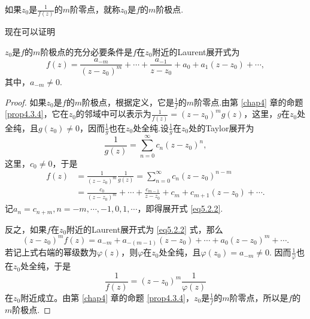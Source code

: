 \begin{definition}\label{def5.2.3}
如果$z_0$是$\frac1{f(z)}$的$m$阶零点，就称$z_0$是$f$的$m$阶极点.
\end{definition}

现在可以证明
\begin{theorem}\label{thm5.2.4}
$z_0$是$f$的$m$阶极点的充分必要条件是$f$在$z_0$附近的Laurent展开式为
\begin{equation}\label{eq5.2.2}
f(z)=\frac{a_{-m}}{(z-z_0)^m}+\cdots+\frac{a_{-1}}{z-z_0}+a_0+a_1(z-z_0)+\cdots,
\end{equation}
其中，$a_{-m}\ne0$.
\end{theorem}
\begin{proof}
  如果$z_0$是$f$的$m$阶极点，根据定义，它是$\frac1f$的$m$阶零点.由第 \ref{chap4} 章的命题 \ref{prop4.3.4}，它在$z_0$的邻域中可以表示为$\frac1{f(z)}=(z-z_0)^mg(z)$，这里，$g$在$z_0$处全纯，且$g(z_0)\ne0$，因而$\frac1g$也在$z_0$处全纯.设$\frac1g$在$z_0$处的Taylor展开为
  \[\frac1{g(z)}=\sum_{n=0}^\infty c_n(z-z_0)^n,\]
这里，$c_0\ne0$，于是
\begin{align*}
f(z)&=\frac1{(z-z_0)^m}\frac1{g(z)}=\sum_{n=0}^\infty c_n(z-z_0)^{n-m}\\
&=\frac{c_0}{(z-z_0)^m}+\cdots+\frac{c_{m-1}}{z-z_0}
+c_m+c_{m+1}(z-z_0)+\cdots.
\end{align*}
记$a_n=c_{n+m},n=-m,\cdots,-1,0,1,\cdots$，即得展开式 \eqref{eq5.2.2}.

反之，如果$f$在$z_0$附近的Laurent展开式为 \eqref{eq5.2.2} 式，那么
\[(z-z_0)^mf(z)=a_{-m}+a_{-(m-1)}(z-z_0)+\cdots+a_0(z-z_0)^m+\cdots.\]
若记上式右端的幂级数为$\varphi(z)$，则$\varphi$在$z_0$处全纯，且$\varphi(z_0)=a_{-m}\ne0$. 因而$\frac1{\varphi}$也在$z_0$处全纯，于是
\[\frac1{f(z)}=(z-z_0)^m\frac1{\varphi(z)}\]
在$z_0$附近成立。由第 \ref{chap4} 章的命题 \ref{prop4.3.4}，$z_0$是$\frac1f$的$m$阶零点，所以是$f$的$m$阶极点.
\end{proof}

